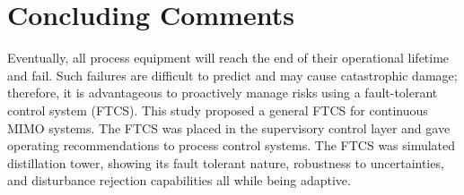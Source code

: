 \section{Concluding Comments}
Eventually, all process equipment will reach the end of their operational lifetime and fail.  Such failures are difficult to predict and may cause catastrophic damage; therefore, it is advantageous to proactively manage risks using a fault-tolerant control system (FTCS).  This study proposed a general FTCS for continuous MIMO systems. The FTCS was placed in the supervisory control layer and gave operating recommendations to process control systems. The FTCS was simulated distillation tower, showing its fault tolerant nature, robustness to uncertainties, and disturbance rejection capabilities all while being adaptive.  
